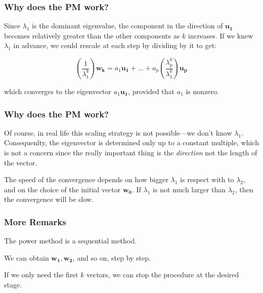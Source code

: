 \documentclass[12pt]{beamer}\usepackage[]{graphicx}\usepackage[]{color}
\begin{document}

\begin{frame}
\frametitle{Why does the PM work?}

Since $\lambda_1$ is the dominant eigenvalue, the component in the direction of 
$\mathbf{u_1}$ becomes relatively greater than the other components as $k$ 
increases. If we knew $\lambda_1$ in advance, we could rescale at each step by 
dividing by it to get:

$$
\left(\frac{1}{\lambda_{1}^k}\right) \mathbf{w_k}= a_1 \mathbf{u_1} + \dots + a_p \left(\frac{\lambda_{p}^k}{\lambda_{1}^k}\right) \mathbf{u_p}
$$

which converges to the eigenvector $a_1 \mathbf{u_1}$, provided that $a_1$ is nonzero.

\end{frame}


\begin{frame}
\frametitle{Why does the PM work?}

Of course, in real life this scaling strategy is not possible---we 
don't know $\lambda_1$. Consequenlty, the eigenvector is determined only up to 
a constant multiple, which is not a concern since the really important thing is 
the \textit{direction} not the length of the vector.

\bigskip
The speed of the convergence depends on how bigger $\lambda_1$ is respect with 
to $\lambda_2$, and on the choice of the initial vector $\mathbf{w_0}$. If 
$\lambda_1$ is not much larger than $\lambda_2$, then the convergence will be 
slow.

\end{frame}


\begin{frame}
\frametitle{More Remarks}

\bbi
  \item The power method is a sequential method.
  \item We can obtain $\mathbf{w_1, w_2}$, and so on, step by step.
  \item If we only need the first $k$ vectors, we can stop the procedure at the desired stage.
\ei

\end{frame}

\end{document}
